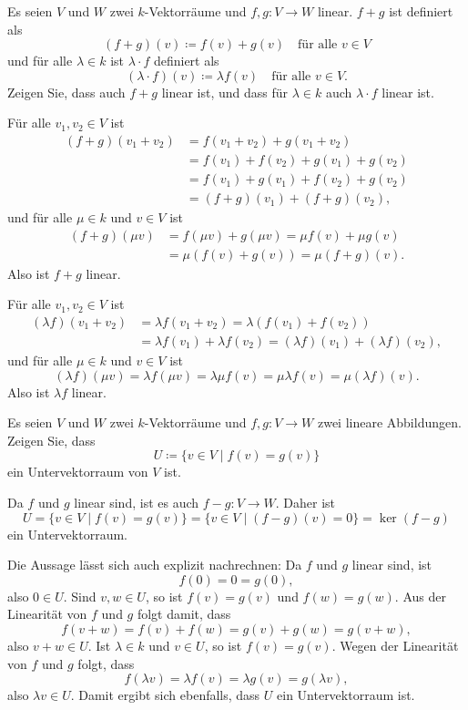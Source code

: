 \begin{question}
 Es seien $V$ und $W$ zwei $k$-Vektorräume und $f, g \colon V \to W$ linear. $f + g$ ist definiert als
 \[
  (f + g)(v) \coloneqq f(v) + g(v) \quad \text{für alle $v \in V$}
 \]
 und für alle $\lambda \in k$ ist $\lambda \cdot f$ definiert als
 \[
  (\lambda \cdot f)(v) \coloneqq \lambda f(v) \quad \text{für alle $v \in V$}.
 \]
 Zeigen Sie, dass auch $f + g$ linear ist, und dass für $\lambda \in k$ auch $\lambda \cdot f$ linear ist.
\end{question}
\begin{solution}
 Für alle $v_1, v_2 \in V$ ist
 \begin{align*}
  (f + g)(v_1 + v_2)
  &= f(v_1 + v_2) + g(v_1 + v_2) \\
  &= f(v_1) + f(v_2) + g(v_1) + g(v_2) \\
  &= f(v_1) + g(v_1) + f(v_2) + g(v_2) \\
  &= (f + g)(v_1) + (f + g)(v_2),
 \end{align*}
 und für alle $\mu \in k$ und $v \in V$ ist
 \begin{align*}
  (f + g)(\mu v)
  &= f(\mu v) + g(\mu v)
  = \mu f(v) + \mu g(v) \\
  &= \mu (f(v) + g(v))
  = \mu (f + g)(v).
 \end{align*}
 Also ist $f + g$ linear.
 
 Für alle $v_1, v_2 \in V$ ist
 \begin{align*}
  (\lambda f)(v_1 + v_2)
  &= \lambda f(v_1 + v_2)
  = \lambda (f(v_1) + f(v_2)) \\
  &= \lambda f(v_1) + \lambda f(v_2)
  = (\lambda f)(v_1) + (\lambda f)(v_2),
 \end{align*}
 und für alle $\mu \in k$ und $v \in V$ ist
 \[
  (\lambda f)(\mu v)
  = \lambda f(\mu v)
  = \lambda \mu f(v)
  = \mu \lambda f(v)
  = \mu (\lambda f)(v).
 \]
 Also ist $\lambda f$ linear.
\end{solution}



\begin{question}
 Es seien $V$ und $W$ zwei $k$-Vektorräume und $f, g \colon V \to W$ zwei lineare Abbildungen. Zeigen Sie, dass 
 \[
  U \coloneqq \{v \in V \mid f(v) = g(v)\}
 \]
 ein Untervektorraum von $V$ ist.
\end{question}
\begin{solution}
 Da $f$ und $g$ linear sind, ist es auch $f-g \colon V \to W$. Daher ist
 \[
  U
  = \{v \in V \mid f(v) = g(v)\} 
  = \{v \in V \mid (f-g)(v) = 0\}
  = \ker (f-g)
 \]
 ein Untervektorraum.
 
 Die Aussage lässt sich auch explizit nachrechnen: Da $f$ und $g$ linear sind, ist
 \[
  f(0) = 0 = g(0),
 \]
 also $0 \in U$. Sind $v, w \in U$, so ist $f(v) = g(v)$ und $f(w) = g(w)$. Aus der Linearität von $f$ und $g$ folgt damit, dass
 \[
  f(v+w) = f(v) + f(w) = g(v) + g(w) = g(v+w),
 \]
 also $v+w \in U$. Ist $\lambda \in k$ und $v \in U$, so ist $f(v) = g(v)$. Wegen der Linearität von $f$ und $g$ folgt, dass
 \[
  f(\lambda v) = \lambda f(v) = \lambda g(v) = g(\lambda v),
 \]
 also $\lambda v \in U$. Damit ergibt sich ebenfalls, dass $U$ ein Untervektorraum ist.
\end{solution}


